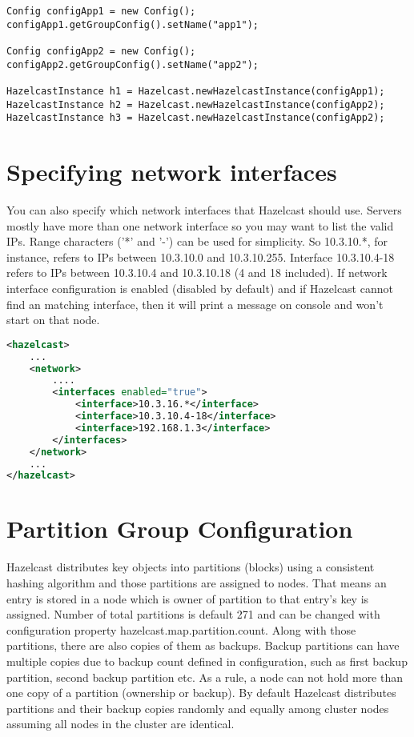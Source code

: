 \begin{verbatim}
Config configApp1 = new Config();
configApp1.getGroupConfig().setName("app1");

Config configApp2 = new Config();
configApp2.getGroupConfig().setName("app2");

HazelcastInstance h1 = Hazelcast.newHazelcastInstance(configApp1);
HazelcastInstance h2 = Hazelcast.newHazelcastInstance(configApp2);
HazelcastInstance h3 = Hazelcast.newHazelcastInstance(configApp2);
\end{verbatim}

\section{Specifying network interfaces}

You can also specify which network interfaces that Hazelcast should use. Servers mostly have more than one network interface so you may want to list the valid IPs. Range characters ('*' and '-') can be used for simplicity. So 10.3.10.*, for instance, refers to IPs between 10.3.10.0 and 10.3.10.255. Interface 10.3.10.4-18 refers to IPs between 10.3.10.4 and 10.3.10.18 (4 and 18 included). If network interface configuration is enabled (disabled by default) and if Hazelcast cannot find an matching interface, then it will print a message on console and won't start on that node.

\begin{lstlisting}[language=xml]
<hazelcast>
    ...
    <network>
        ....
        <interfaces enabled="true">
            <interface>10.3.16.*</interface> 
            <interface>10.3.10.4-18</interface> 
            <interface>192.168.1.3</interface>         
        </interfaces>    
    </network>
    ...
</hazelcast>
\end{lstlisting}

\section{Partition Group Configuration}
Hazelcast distributes key objects into partitions (blocks) using a consistent hashing algorithm and those partitions are assigned to nodes. That means an entry is stored in a node which is owner of partition to that entry's key is assigned. Number of total partitions is default 271 and can be changed with configuration property hazelcast.map.partition.count. Along with those partitions, there are also copies of them as backups. Backup partitions can have multiple copies due to backup count defined in configuration, such as first backup partition, second backup partition etc. As a rule, a node can not hold more than one copy of a partition (ownership or backup). By default Hazelcast distributes partitions and their backup copies randomly and equally among cluster nodes assuming all nodes in the cluster are identical.

